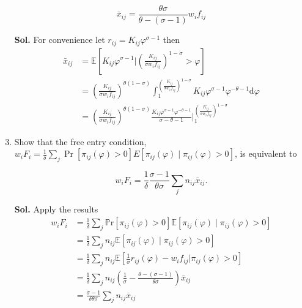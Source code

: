 \documentclass[12pt,oneside,reqno]{amsart}
\newcommand{\pr}{\mathbb{P}\mathrm{r}}
\newcommand{\E}{\mathbb{E}}
\begin{document}
\begin{enumerate}[label=\textbf{\roman*.}]
\begin{equation*}
\bar{x}_{i j}=\frac{\theta \sigma}{\theta-(\sigma-1)} w_{i} f_{i j}
\end{equation*}

\item[\textbf{Sol.}] For convenience let $r_{ij}=K_{ij}\varphi^{\sigma-1}$ then 
\begin{align*}
    \bar{x}_{i j} &= \E\left[ K_{ij}\varphi^{\sigma-1} \Bigg\vert  \left(\frac{K_{ij}}{\sigma w_if_{ij}}\right)^{1-\sigma}>\varphi \right] \\ 
    &= \left(\frac{K_{ij}}{\sigma w_if_{ij}}\right)^{\theta(1-\sigma)}\int_1^{ \left(\frac{K_{ij}}{\sigma w_if_{ij}}\right)^{1-\sigma}} K_{ij}\varphi^{\sigma-1} \varphi^{-\theta-1}\mathrm{d}\varphi \\ 
    &= \left(\frac{K_{ij}}{\sigma w_if_{ij}}\right)^{\theta(1-\sigma)} \frac{K_{ij}\varphi^{\sigma-1} \varphi^{-\theta-1}}{\sigma-\theta-1}\Bigg\vert_1^{ \left(\frac{K_{ij}}{\sigma w_if_{ij}}\right)^{1-\sigma}} 
\end{align*}

\item Show that the free entry condition, $w_{i} F_{i}=\frac{1}{\delta} \sum_{j} \Pr\left[\pi_{i j}(\varphi)>0\right] E\left[\pi_{i j}(\varphi) \mid \pi_{i j}(\varphi)>0\right]$, is equivalent to

\begin{equation*}
w_{i} F_{i}=\frac{1}{\delta} \frac{\sigma-1}{\theta \sigma} \sum_{j} n_{i j} \bar{x}_{i j} .
\end{equation*}

\item[\textbf{Sol.}] Apply the results
\begin{align*}
    w_{i} F_{i} &=\frac{1}{\delta} \sum_{j} \pr\left[\pi_{i j}(\varphi)>0\right] \E\left[\pi_{i j}(\varphi) \mid \pi_{i j}(\varphi)>0\right] \\ 
    &=\frac{1}{\delta} \sum_{j} n_{ij} \E\left[\pi_{i j}(\varphi) \mid \pi_{i j}(\varphi)>0\right] \\ 
    &=\frac{1}{\delta} \sum_{j} n_{ij} \E\left[\frac{1}{\sigma}r_{i j}(\varphi) -w_{i} f_{i j} \bigg\vert \pi_{i j}(\varphi)>0\right] \\ 
    &=\frac{1}{\delta} \sum_{j} n_{ij} \left(\frac{1}{\sigma}-\frac{\theta-(\sigma-1)}{\theta\sigma}\right)\overline{x}_{ij} \\ 
    &=\frac{\sigma-1}{\delta\theta\sigma} \sum_{j} n_{ij} \overline{x}_{ij}
\end{align*}


\end{enumerate}
\end{document}
